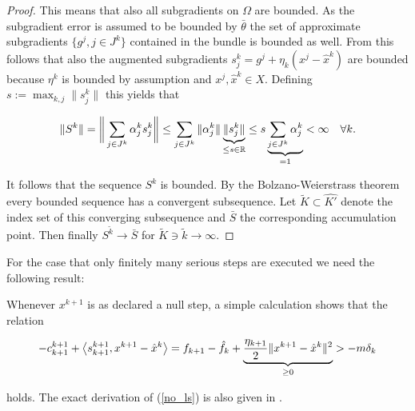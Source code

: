 \begin{proof}
		This means that also all subgradients on \(\Omega\) are bounded. As the subgradient error is assumed to be bounded by \(\bar{\theta}\) the set of approximate subgradients \(\{g^j, j \in J^k\}\) contained in the bundle is bounded as well.
		From this follows that also the augmented subgradients \(s_j^k = g^j+\eta_k(x^j-\hat{x}^k)\) are bounded because \(\eta^k\) is bounded by assumption and \(x^j, \hat{x}^k \in X\).		
Defining \(s:= \max_{k,j}\|s^k_j\|\) this yields that 
		
		\[\Vert S^k\Vert = \bigg\Vert\sum_{j \in J^k}{\alpha_j^k s_j^k}\bigg\Vert \leq  \sum_{j \in J^k}{\Vert\alpha_j^k\Vert\underbrace{\Vert s^k_j\Vert}_{\leq s \in \mathbb{R}}} \leq s\underbrace{\sum_{j \in J^k}{\alpha_j^k}}_{=1} < \infty \quad \forall k. \]
		
		It follows that the sequence \(S^k\) is bounded.
		By the Bolzano-Weierstrass theorem \cite[p. 51]{Koenigsberger2003} every bounded sequence has a convergent subsequence. Let \(\tilde{K} \subset \hat{K'}\) denote the index set of this converging subsequence and \(\bar{S}\) the corresponding accumulation point. Then finally \(S^{\tilde{k}} \to \bar{S}\) for \(\tilde{K} \ni {\tilde{k}}\to \infty\).
		
	
\end{proof}


For the case that only finitely many serious steps are executed we need the following result:


Whenever \(x^{k+1}\) is as declared a null step, a simple calculation shows that the relation 

\begin{equation}
	-c^{k+1}_{k+1} + \left\langle s^{k+1}_{k+1}, x^{k+1}-\hat{x}^k\right\rangle = f_{k+1}-\hat{f}_k + \underbrace{\frac{\eta_{k+1}}{2}\Vert x^{k+1}-\hat{x}^{k}\Vert^2}_{\geq 0}>-m\delta_k
\label{no_ls}
\end{equation}

holds.
The exact derivation of (\ref{no_ls}) is also given in \cite[p. 16]{Hare2016}.

